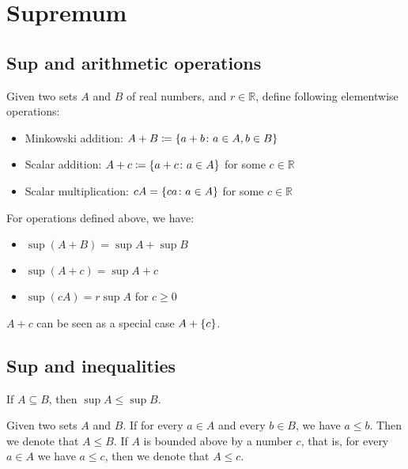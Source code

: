 \documentclass{article}
\newcommand{\R}{\mathbb R}
\DeclarePairedDelimiter\set{\lbrace}{\rbrace}
\begin{document}
\section{Supremum}
\subsection{Sup and arithmetic operations}
\begin{definition}
    Given two sets $ A $ and $ B $ of real numbers, and $ r \in \R $, define following elementwise operations:
    \begin{itemize}
        \item Minkowski addition: $ A + B \coloneq \set{a + b \colon a \in A, b \in B} $
        \item Scalar addition: $ A + c \coloneq \set{a + c \colon a \in A} $ for some $ c \in \R $
        \item Scalar multiplication: $ cA = \set{ca \colon a \in A} $ for some $ c \in \R $
    \end{itemize}
\end{definition}  

\begin{theorem}
    For operations defined above, we have:
    \begin{itemize}
        \item $ \sup (A + B) = \sup A + \sup B $
        \item $ \sup (A + c) = \sup A + c $
        \item $ \sup (cA) = r \sup A $ for $ c \geqslant 0 $
    \end{itemize}
\end{theorem}

$ A + c $ can be seen as a special case $ A + \set{c} $.

\subsection{Sup and inequalities}
\begin{theorem}
    If $ A \subseteq B $, then $ \sup A \leqslant \sup B $.
\end{theorem}

\begin{definition}
    Given two sets $ A $ and $ B $. If for every $ a \in A $ and every $ b \in B $, we have $ a \leqslant b $. Then we denote that $ A \leqslant B $. If $ A $ is bounded above by a number $ c $, that is, for every $ a \in A $ we have $ a \leqslant c $, then we denote that $ A \leqslant c $.
\end{definition}
\end{document}
